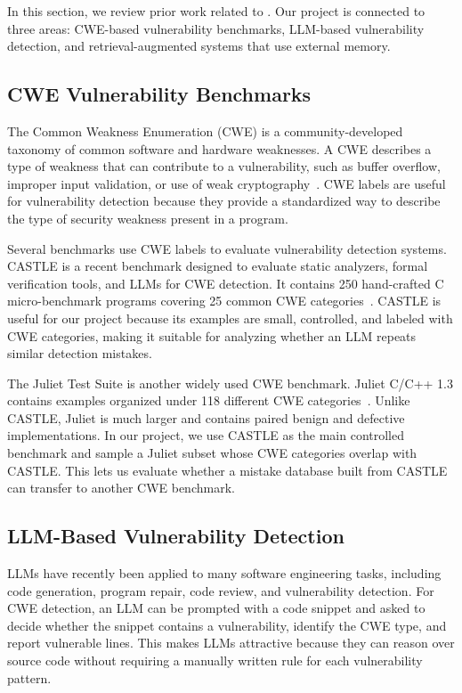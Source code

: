 \label{sec:related}

In this section, we review prior work related to \system. Our project is connected to three areas: CWE-based vulnerability benchmarks, LLM-based vulnerability detection, and retrieval-augmented systems that use external memory.

\subsection{CWE Vulnerability Benchmarks}

The Common Weakness Enumeration (CWE) is a community-developed taxonomy of common software and hardware weaknesses. A CWE describes a type of weakness that can contribute to a vulnerability, such as buffer overflow, improper input validation, or use of weak cryptography~\cite{cwe}. CWE labels are useful for vulnerability detection because they provide a standardized way to describe the type of security weakness present in a program.

Several benchmarks use CWE labels to evaluate vulnerability detection systems. CASTLE is a recent benchmark designed to evaluate static analyzers, formal verification tools, and LLMs for CWE detection. It contains 250 hand-crafted C micro-benchmark programs covering 25 common CWE categories~\cite{castle,castle_github}. CASTLE is useful for our project because its examples are small, controlled, and labeled with CWE categories, making it suitable for analyzing whether an LLM repeats similar detection mistakes.

The Juliet Test Suite is another widely used CWE benchmark. Juliet C/C++ 1.3 contains examples organized under 118 different CWE categories~\cite{juliet_nist}. Unlike CASTLE, Juliet is much larger and contains paired benign and defective implementations. In our project, we use CASTLE as the main controlled benchmark and sample a Juliet subset whose CWE categories overlap with CASTLE. This lets us evaluate whether a mistake database built from CASTLE can transfer to another CWE benchmark.

\subsection{LLM-Based Vulnerability Detection}

LLMs have recently been applied to many software engineering tasks, including code generation, program repair, code review, and vulnerability detection. For CWE detection, an LLM can be prompted with a code snippet and asked to decide whether the snippet contains a vulnerability, identify the CWE type, and report vulnerable lines. This makes LLMs attractive because they can reason over source code without requiring a manually written rule for each vulnerability pattern.

